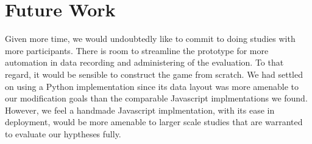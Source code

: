 \documentclass[conference]{IEEEtran}
\begin{document}


\section{Future Work}
Given more time, we would undoubtedly like to commit to doing studies with more participants. There is room to streamline the prototype for more automation in data recording and administering of the evaluation. To that regard, it would be sensible to construct the game from scratch. We had settled on using a Python implementation \cite{report:pytetris} since its data layout was more amenable to our modification goals than the comparable Javascript implmentations we found. However, we feel a handmade Javascript implmentation, with its ease in deployment, would be more amenable to larger scale studies that are warranted to evaluate our hyptheses fully.
\end{document}
